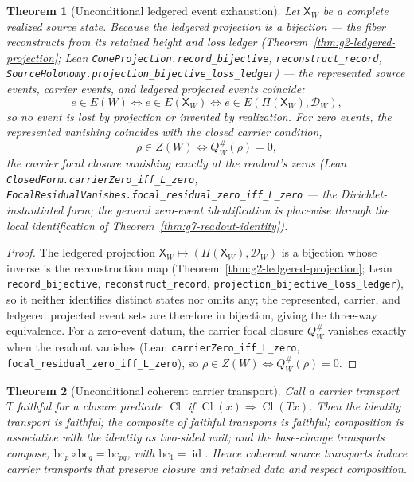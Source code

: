 \documentclass[11pt]{article}
\newtheorem{theorem}{Theorem}
\theoremstyle{definition}
\begin{document}
\begin{theorem}[Unconditional ledgered event exhaustion]\label{thm:g10-ledgered-event-exhaustion}
Let \(\mathsf X_W\) be a complete realized source state.  Because the ledgered
projection is a bijection --- the fiber reconstructs from its retained height and
loss ledger (Theorem~\ref{thm:g2-ledgered-projection}; Lean
\texttt{ConeProjection.record\_bijective}, \texttt{reconstruct\_record},\\
\texttt{SourceHolonomy.projection\_bijective\_loss\_ledger}) --- the represented
source events, carrier events, and ledgered projected events coincide:
\[
e\in E(W)
\iff
e\in E(\mathsf X_W)
\iff
e\in E(\Pi(\mathsf X_W),\mathcal D_W),
\]
so no event is lost by projection or invented by realization.  For zero events,
the represented vanishing coincides with the closed carrier condition,
\[
\rho\in Z(W)\iff Q_W^\#(\rho)=0,
\]
the carrier focal closure vanishing exactly at the readout's zeros (Lean
\texttt{ClosedForm.carrierZero\_iff\_L\_zero},
\texttt{FocalResidualVanishes.focal\_residual\_zero\_iff\_L\_zero} --- the
Dirichlet-instantiated form; the general zero-event identification is
placewise through the local identification of
Theorem~\ref{thm:g7-readout-identity}).
\end{theorem}

\begin{proof}
The ledgered projection \(\mathsf X_W\mapsto(\Pi(\mathsf X_W),\mathcal D_W)\) is
a bijection whose inverse is the reconstruction map
(Theorem~\ref{thm:g2-ledgered-projection}; Lean \texttt{record\_bijective},
\texttt{reconstruct\_record}, \texttt{projection\_bijective\_loss\_ledger}), so it
neither identifies distinct states nor omits any; the represented, carrier, and
ledgered projected event sets are therefore in bijection, giving the three-way
equivalence.  For a zero-event datum, the carrier focal closure \(Q_W^\#\)
vanishes exactly when the readout vanishes (Lean
\texttt{carrierZero\_iff\_L\_zero},
\texttt{focal\_residual\_zero\_iff\_L\_zero}), so
\(\rho\in Z(W)\iff Q_W^\#(\rho)=0\).
\end{proof}

\begin{theorem}[Unconditional coherent carrier transport]\label{thm:g10-coherent-carrier-transport}
Call a carrier transport \(T\) \emph{faithful} for a closure predicate
\(\operatorname{Cl}\) if \(\operatorname{Cl}(x)\Rightarrow\operatorname{Cl}(Tx)\).
Then the identity transport is faithful; the composite of faithful transports is
faithful; composition is associative with the identity as two-sided unit; and
the base-change transports compose,
\(\mathrm{bc}_p\circ\mathrm{bc}_q=\mathrm{bc}_{pq}\), with
\(\mathrm{bc}_1=\operatorname{id}\).  Hence coherent source transports induce
carrier transports that preserve closure and retained data and respect
composition.
\end{theorem}
\end{document}

